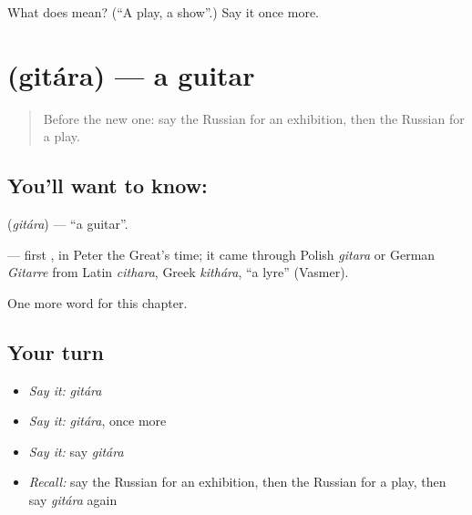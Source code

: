 \begin{tcolorbox}[breakable,colback=teal!4,colframe=teal!35!black,title={Before you move on}]
What does  mean? (\textquotedblleft{}A play, a show\textquotedblright{}.) Say it once more.
\end{tcolorbox}
\section[\texorpdfstring{\ru{гитара} (gitára)}{гитара (gitára)}]{ (gitára) — a guitar}

\label{lesson:RU-C197-gitara}



\begin{quote}
Before the new one: say the Russian for an exhibition, then the Russian for a play.
\end{quote}

\subsection*{You'll want to know: }
\textbf{} (\emph{gitára}) — \textquotedblleft{}a guitar\textquotedblright{}.

\begin{cousinweb}
\textbf{} — first \emph{}, in Peter the Great's time; it came through Polish \emph{gitara} or German \emph{Gitarre} from Latin \emph{cithara}, Greek \emph{kithára}, \textquotedblleft{}a lyre\textquotedblright{} (Vasmer).
\end{cousinweb}

\begin{grammarlens}[title={What you've built}]
One more word for this chapter.
\end{grammarlens}

\subsection*{Your turn}
\begin{itemize}
\raggedright
  \item \emph{Say it:} \emph{gitára}
  \item \emph{Say it:} \emph{gitára}, once more
  \item \emph{Say it:} say \emph{gitára}
  \item \emph{Recall:} say the Russian for an exhibition, then the Russian for a play, then say \emph{gitára} again
\end{itemize}

